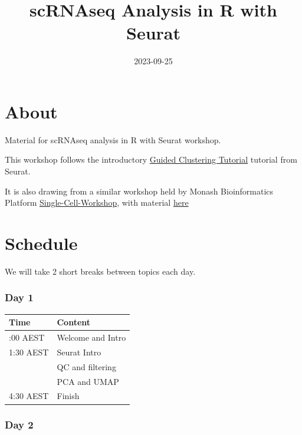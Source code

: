 \documentclass[
]{book}
\title{scRNAseq Analysis in R with Seurat}
\author{}
\date{\vspace{-2.5em}2023-09-25}
\begin{document}
\maketitle

{
\setcounter{tocdepth}{1}
\tableofcontents
}
\hypertarget{about}{%
\chapter{About}\label{about}}

Material for scRNAseq analysis in R with Seurat workshop.

This workshop follows the introductory \href{https://satijalab.org/seurat/articles/pbmc3k_tutorial.html}{Guided Clustering Tutorial} tutorial from Seurat.

It is also drawing from a similar workshop held by Monash Bioinformatics Platform \href{https://monashbioinformaticsplatform.github.io/Single-Cell-Workshop/}{Single-Cell-Workshop}, with material \href{https://monashbioinformaticsplatform.github.io/Single-Cell-Workshop/pbmc3k_tutorial.html}{here}

\hypertarget{schedule}{%
\chapter{Schedule}\label{schedule}}

We will take 2 short breaks between topics each day.

\hypertarget{day-1}{%
\subsection*{Day 1}\label{day-1}}

\begin{longtable}[]{@{}ll@{}}
\toprule\noalign{}
Time & Content \\
\midrule\noalign{}
\endhead
\bottomrule\noalign{}
\endlastfoot
1:00 AEST & Welcome and Intro \\
1:30 AEST & Seurat Intro \\
& QC and filtering \\
& PCA and UMAP \\
4:30 AEST & Finish \\
\end{longtable}

\hypertarget{day-2}{%
\subsection*{Day 2}\label{day-2}}
\end{document}
